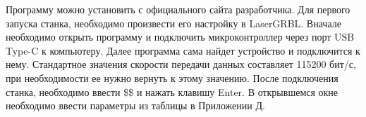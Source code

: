 Программу можно установить с официального сайта разработчика\cite{laserGRBL}.
Для первого запуска станка, необходимо произвести его настройку в LaserGRBL.
Вначале необходимо открыть программу и подключить микроконтроллер через порт USB Type-C к компьютеру.
Далее программа сама найдет устройство и подключится к нему. Стандартное значения скорости передачи данных 
составляет 115200 бит/с, при необходимости ее нужно вернуть к этому значению. 
После подключения станка, необходимо ввести \$\$ и нажать клавишу Enter.
В открывшемся окне необходимо ввести параметры из таблицы в Приложении \hyperref[sec:appendix:grbl]{Д}.



